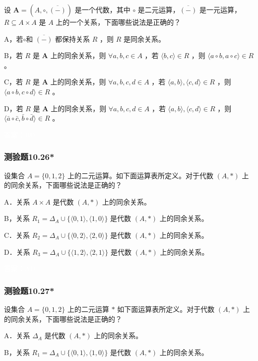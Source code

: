 \documentclass[UTF8, heading=true]{ctexart}
\begin{document}
设 $\mathbf{A}=(A, \circ, \overline{(-)})$ 是一个代数，其中 $\circ$ 是二元运算，$\overline{(-)}$ 是一元运算，$R \subseteq A \times A$ 是 $A$ 上的一个关系，下面哪些说法是正确的？

A，若$\circ$和 $\overline{(-)}$ 都保持关系 $R$ ，则 $R$ 是同余关系。

B，若 $R$ 是 $\mathbf{A}$ 上的同余关系，则 $\forall a, b, c \in A$ ，若 $\langle b, c\rangle \in R$ ，则 $\langle a \circ b, a \circ c\rangle \in R$ 。

C，若 $R$ 是 $\mathbf{A}$ 上的同余关系，则 $\forall a, b, c, d \in A$ ，若 $\langle a, b\rangle,\langle c, d\rangle \in R$ ，则 $\langle a \circ b, c \circ d\rangle \in R$ 。

D，若 $R$ 是 $\mathbf{A}$ 上的同余关系，则 $\forall a, b, c, d \in A$ ，若 $\langle a, b\rangle,\langle c, d\rangle \in R$ ，则 $\langle\bar{a} \circ \bar{c}, \bar{b} \circ \bar{d}\rangle \in R$ 。


\textcolor{white}{答案：BD}

\subsubsection{测验题10.26*}

设集合 $A=\{0,1,2\}$ 上的二元运算。如下面运算表所定义。对于代数 $(A, *)$ 上的同余关系，下面哪些说法是正确的？

A．关系 $A \times A$ 是代数 $(A, *)$ 上的同余关系。

B，关系 $R_1=\Delta_A \cup\{\langle 0,1\rangle,\langle 1,0\rangle\}$ 是代数 $(A, *)$ 上的同余关系。

C．关系 $R_2=\Delta_A \cup\{\langle 0,2\rangle,\langle 2,0\rangle\}$ 是代数 $(A, *)$ 上的同余关系。

D．关系 $R_3=\Delta_A \cup\{\langle 1,2\rangle,\langle 2,1\rangle\}$ 是代数 $(A, *)$ 上的同余关系。

\textcolor{white}{答案：AD}

\subsubsection{测验题10.27*}

设集合 $A=\{0,1,2\}$ 上的二元运算 $*$ 如下面运算表所定义。对于代数 $(A, *)$ 上的同余关系，下面哪些说法是正确的？

A．关系 $\Delta_A$ 是代数 $(A, *)$ 上的同余关系。

B，关系 $R_1=\Delta_A \cup\{\langle 0,1\rangle,\langle 1,0\rangle\}$ 是代数 $(A, *)$ 上的同余关系。
\end{document}

